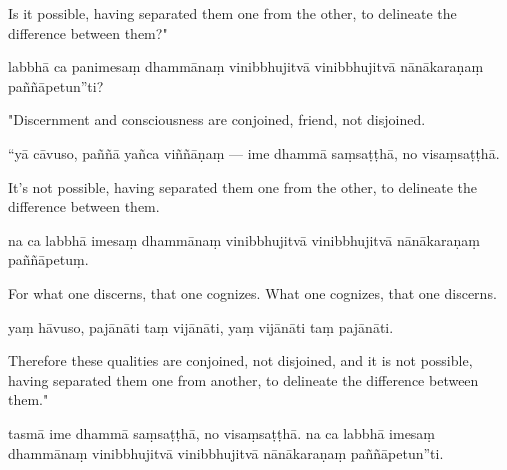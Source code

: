 \begin{samepage}
\begin{leftcolumn*}
Is it possible, having separated them one from the other, to delineate the difference between them?"
\end{leftcolumn*}

\begin{rightcolumn}
labbhā ca panimesaṃ dhammānaṃ vinibbhujitvā vinibbhujitvā nānākaraṇaṃ paññāpetun”ti?
\end{rightcolumn}
\end{samepage}

\begin{samepage}
\begin{leftcolumn*}
"Discernment and consciousness are conjoined, friend, not disjoined.
\end{leftcolumn*}

\begin{rightcolumn}
“yā cāvuso, paññā yañca viññāṇaṃ — ime dhammā saṃsaṭṭhā, no visaṃsaṭṭhā.
\end{rightcolumn}
\end{samepage}

\begin{samepage}
\begin{leftcolumn*}
It's not possible, having separated them one from the other, to delineate the difference between them.
\end{leftcolumn*}

\begin{rightcolumn}
na ca labbhā imesaṃ dhammānaṃ vinibbhujitvā vinibbhujitvā nānākaraṇaṃ paññāpetuṃ.
\end{rightcolumn}
\end{samepage}

\begin{samepage}
\begin{leftcolumn*}
For what one discerns, that one cognizes. What one cognizes, that one discerns.
\end{leftcolumn*}

\begin{rightcolumn}
yaṃ hāvuso, pajānāti taṃ vijānāti, yaṃ vijānāti taṃ pajānāti.
\end{rightcolumn}
\end{samepage}

\begin{samepage}
\begin{leftcolumn*}
Therefore these qualities are conjoined, not disjoined, and it is not possible, having separated them one from another, to delineate the difference between them."
\end{leftcolumn*}

\begin{rightcolumn}
tasmā ime dhammā saṃsaṭṭhā, no visaṃsaṭṭhā. na ca labbhā imesaṃ dhammānaṃ vinibbhujitvā vinibbhujitvā nānākaraṇaṃ paññāpetun”ti.
\end{rightcolumn}
\end{samepage}

